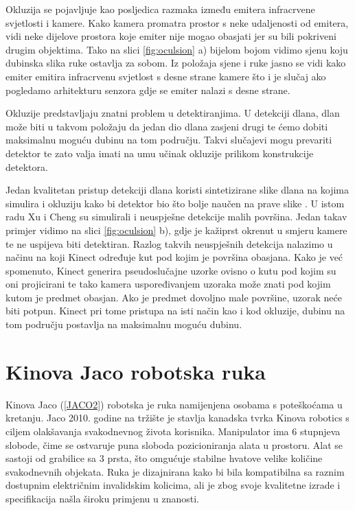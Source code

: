 \documentclass[times, utf8, diplomski, numeric]{fer}
\begin{document}
Okluzija se pojavljuje kao posljedica razmaka između emitera infracrvene svjetlosti i kamere. Kako kamera promatra prostor s neke udaljenosti od emitera, vidi neke dijelove prostora koje emiter nije mogao obasjati jer su bili pokriveni drugim objektima. Tako na slici \ref{fig:oculsion} a) bijelom bojom vidimo sjenu koju dubinska slika ruke ostavlja za sobom. Iz položaja sjene i ruke jasno se vidi kako emiter emitira infracrvenu svjetlost s desne strane kamere što i je slučaj ako pogledamo arhitekturu senzora gdje se emiter nalazi s desne strane.

Okluzije predstavljaju znatni problem u detektiranjima. U detekciji dlana, dlan može biti u takvom položaju da jedan dio dlana zasjeni drugi te ćemo dobiti maksimalnu moguću dubinu na tom području. Takvi slučajevi mogu prevariti detektor te zato valja imati na umu učinak okluzije prilikom konstrukcije detektora.

Jedan kvalitetan pristup detekciji dlana koristi sintetizirane slike dlana na kojima simulira i okluziju kako bi detektor bio što bolje naučen na prave slike \citep{xu2013efficient}. U istom radu Xu i Cheng su simulirali i neuspješne detekcije malih površina. Jedan takav primjer vidimo na slici \ref{fig:oculsion} b), gdje je kažiprst okrenut u smjeru kamere te ne uspijeva biti detektiran. Razlog takvih neuspješnih detekcija nalazimo u načinu na koji Kinect određuje kut pod kojim je površina obasjana. Kako je već spomenuto, Kinect generira pseudoslučajne uzorke ovisno o kutu pod kojim su oni projicirani te tako kamera uspoređivanjem uzoraka može znati pod kojim kutom je predmet obasjan. Ako je predmet dovoljno male površine, uzorak neće biti potpun. Kinect pri tome pristupa na isti način kao i kod okluzije, dubinu na tom području postavlja na maksimalnu moguću dubinu.

\newpage
\section{Kinova Jaco robotska ruka}
Kinova Jaco (\ref{JACO2}) robotska je ruka namijenjena osobama s poteškoćama u kretanju.
Jaco 2010. godine na tržište je stavlja kanadska tvrka Kinova robotics s ciljem olakšavanja svakodnevnog života korisnika.
Manipulator ima 6 stupnjeva slobode, čime se ostvaruje puna sloboda pozicioniranja alata u prostoru.
Alat se sastoji od grabilice sa 3 prsta, što omgućuje stabilne hvatove velike količine svakodnevnih objekata.
Ruka je dizajnirana kako bi bila kompatibilna sa raznim dostupnim električnim invalidskim kolicima, ali je zbog svoje kvalitetne izrade i specifikacija našla široku primjenu u znanosti.
\end{document}
